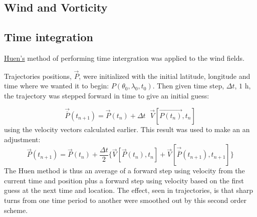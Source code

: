 \documentclass{article}
\begin{document}
\subsection{Wind and Vorticity}

\subsection{Time integration}

\href{https://en.wikipedia.org/wiki/Heun%27s_method}{Huen's} method of performing time intergration was applied to the wind fields.

  Trajectories positions, $\vec{P}$, were initialized with
  the initial latitude, longitude and time where we wanted it to begin: $P(\theta_{0},
  \lambda_{0}, t_{0})$. Then
given time step, $\Delta t$, $\text{1 h}$, the 
   trajectory was stepped forward in time to give an initial guess:

  \begin{equation}
    \vec{\overline{P}}(t_{n+1}) = \vec{P}(t_{n}) + \Delta t \phantom{\cdot}
    \vec{V}[\vec{P(t_{n})},t_{n}]
  \end{equation}
  using the velocity vectors calculated earlier. This result was used
  to make an 
  an adjustment:
  \begin{equation}
    \vec{P}(t_{n+1}) = \vec{P}(t_{n}) +
    \frac{\Delta t}{2}\{\vec{V}[\vec{P}(t_{n}),t_{n}]
      + \vec{V}[\vec{\overline{P}}(t_{n+1}), t_{n+1}]\}
\end{equation}
  The Huen method is thus an average of a forward step using velocity
  from the current time and position plus
  a forward step using velocity based on the first guess at the next time and location. The effect, seen in trajectories, is that sharp turns from one time period to another were smoothed out by this second order scheme.
  
\end{document}
